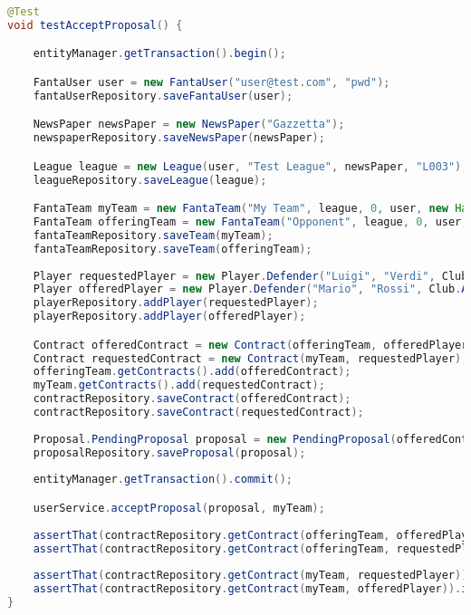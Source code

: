 \begin{lstlisting}[language=Java]
@Test
void testAcceptProposal() {

	entityManager.getTransaction().begin();

	FantaUser user = new FantaUser("user@test.com", "pwd");
	fantaUserRepository.saveFantaUser(user);

	NewsPaper newsPaper = new NewsPaper("Gazzetta");
	newspaperRepository.saveNewsPaper(newsPaper);

	League league = new League(user, "Test League", newsPaper, "L003");
	leagueRepository.saveLeague(league);

	FantaTeam myTeam = new FantaTeam("My Team", league, 0, user, new HashSet<>());
	FantaTeam offeringTeam = new FantaTeam("Opponent", league, 0, user, new HashSet<>());
	fantaTeamRepository.saveTeam(myTeam);
	fantaTeamRepository.saveTeam(offeringTeam);
		
	Player requestedPlayer = new Player.Defender("Luigi", "Verdi", Club.BOLOGNA);
	Player offeredPlayer = new Player.Defender("Mario", "Rossi", Club.ATALANTA);
	playerRepository.addPlayer(requestedPlayer);
	playerRepository.addPlayer(offeredPlayer);

	Contract offeredContract = new Contract(offeringTeam, offeredPlayer);
	Contract requestedContract = new Contract(myTeam, requestedPlayer);
	offeringTeam.getContracts().add(offeredContract);
	myTeam.getContracts().add(requestedContract);
	contractRepository.saveContract(offeredContract);
	contractRepository.saveContract(requestedContract);
		
	Proposal.PendingProposal proposal = new PendingProposal(offeredContract, requestedContract);
	proposalRepository.saveProposal(proposal);
		
	entityManager.getTransaction().commit();

	userService.acceptProposal(proposal, myTeam);
		
	assertThat(contractRepository.getContract(offeringTeam, offeredPlayer)).isEmpty();
	assertThat(contractRepository.getContract(offeringTeam, requestedPlayer)).isPresent();
		
	assertThat(contractRepository.getContract(myTeam, requestedPlayer)).isEmpty();
	assertThat(contractRepository.getContract(myTeam, offeredPlayer)).isPresent();
}
\end{lstlisting}

